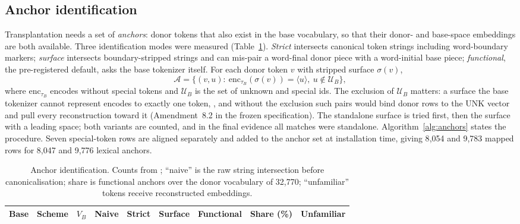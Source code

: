 \subsection{Anchor identification}
\label{sec:method:anchors}
Transplantation needs a set of \emph{anchors}: donor tokens that also exist in the base vocabulary, so that their donor- and base-space embeddings are both available. Three identification modes were measured (Table~\ref{tab:anchors}). \emph{Strict} intersects canonical token strings including word-boundary markers; \emph{surface} intersects boundary-stripped strings and can mis-pair a word-final donor piece with a word-initial base piece; \emph{functional}, the pre-registered default, asks the base tokenizer itself. For each donor token $v$ with stripped surface $\sigma(v)$,
\begin{equation}
\mathcal{A}=\Big\{(v,u):\ \mathrm{enc}_{\tau_B}(\sigma(v))=\langle u\rangle,\ u\notin\mathcal{U}_B\Big\},
\label{eq:anchor}
\end{equation}
where $\mathrm{enc}_{\tau_B}$ encodes without special tokens and $\mathcal{U}_B$ is the set of unknown and special ids. The exclusion of $\mathcal{U}_B$ matters: a surface the base tokenizer cannot represent encodes to exactly one token, , and without the exclusion such pairs would bind donor rows to the UNK vector and pull every reconstruction toward it (Amendment~8.2 in the frozen specification). The standalone surface is tried first, then the surface with a leading space; both variants are counted, and in the final evidence all matches were standalone. Algorithm~\ref{alg:anchors} states the procedure. Seven special-token rows are aligned separately and added to the anchor set at installation time, giving 8{,}054 and 9{,}783 mapped rows for 8{,}047 and 9{,}776 lexical anchors.

\begin{table}[!t]
\caption{Anchor identification. Counts from ; ``naive'' is the raw string intersection before canonicalisation; share is functional anchors over the donor vocabulary of 32{,}770; ``unfamiliar'' tokens receive reconstructed embeddings.}
\label{tab:anchors}
\centering
\footnotesize
\begin{tabular}{@{}llrrrrrrr@{}}
\toprule
Base & Scheme & $V_B$ & Naive & Strict & Surface & Functional & Share (\%) & Unfamiliar \\
\midrule

\end{tabular}
\end{table}

